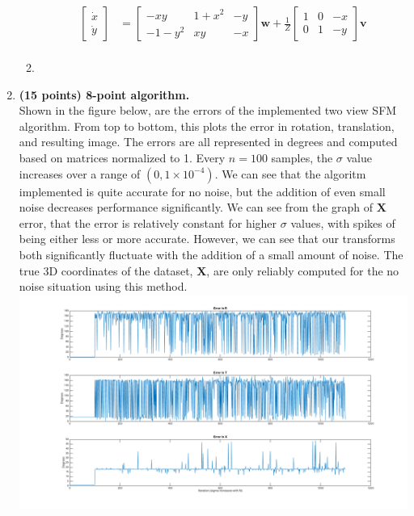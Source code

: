 \documentclass[10pt]{article}
\def\v{\boldsymbol{v}}
\def\w{\boldsymbol{w}}
\def\X{\boldsymbol{X}}
\begin{document}
\begin{enumerate}
\begin{enumerate}
\begin{align*}
\begin{bmatrix} \dot{x} \\ \dot{y}  \end{bmatrix} &= \begin{bmatrix}-xy&1+x^2&-y\\-1-y^2&xy&-x\end{bmatrix} \w + \frac{1}{Z} \begin{bmatrix} 1 & 0 & -x \\ 0& 1 & -y  \end{bmatrix} \v\\
\end{align*}
\item
\end{enumerate}

\item \textbf{(15 points) 8-point algorithm.} \\
Shown in the figure below, are the errors of the implemented two view SFM algorithm. From top to bottom, this plots the error in rotation, translation, and resulting image. The errors are all represented in degrees and computed based on matrices normalized to 1. Every $n = 100$ samples, the $\sigma$ value increases over a range of $(0, 1\times 10^{-4})$. We can see that the algoritm implemented is quite accurate for no noise, but the addition of even small noise  decreases performance significantly. We can see from the graph of $\X$ error, that the error is relatively constant for higher $\sigma$ values, with spikes of being either less or more accurate. However, we can see that our transforms both significantly fluctuate with the addition of a small amount of noise. The true 3D coordinates of the dataset, $\X$, are only reliably computed for the no noise situation using this method. \\ \includegraphics[scale=0.3]{hw5q3.png}

\end{enumerate}
\end{document}
